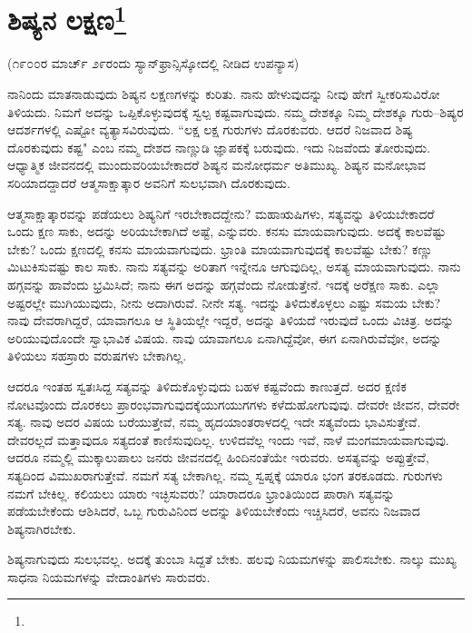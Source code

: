 
\chapter[ಶಿಷ್ಯನ ಲಕ್ಷಣ]{ಶಿಷ್ಯನ ಲಕ್ಷಣ\protect\footnote{}}

\begin{center}
(೧೯೦೦ರ ಮಾರ್ಚ್ ೨೯ರಂದು ಸ್ಯಾನ್‌ಫ್ರಾನ್ಸಿಸ್ಕೋದಲ್ಲಿ ನೀಡಿದ ಉಪನ್ಯಾಸ)
\end{center}

ನಾನಿಂದು ಮಾತನಾಡುವುದು ಶಿಷ್ಯನ ಲಕ್ಷಣಗಳನ್ನು ಕುರಿತು. ನಾನು ಹೇಳುವುದನ್ನು ನೀವು ಹೇಗೆ ಸ್ವೀಕರಿಸುವಿರೋ ತಿಳಿಯದು. ನಿಮಗೆ ಅದನ್ನು ಒಪ್ಪಿಕೊಳ್ಳುವುದಕ್ಕೆ ಸ್ವಲ್ಪ ಕಷ್ಟವಾಗುವುದು. ನಮ್ಮ ದೇಶಕ್ಕೂ ನಿಮ್ಮ ದೇಶಕ್ಕೂ ಗುರು–ಶಿಷ್ಯರ ಆದರ್ಶಗಳಲ್ಲಿ ಎಷ್ಟೋ ವ್ಯತ್ಯಾಸವಿರುವುದು. “ಲಕ್ಷ ಲಕ್ಷ ಗುರುಗಳು ದೊರಕುವರು. ಆದರೆ ನಿಜವಾದ ಶಿಷ್ಯ ದೊರಕುವುದು ಕಷ್ಟ" ಎಂಬ ನಮ್ಮ ದೇಶದ ನಾಣ್ಣುಡಿ ಜ್ಞಾಪಕಕ್ಕೆ ಬರುವುದು. ಇದು ನಿಜವೆಂದು ತೋರುವುದು. ಆಧ್ಯಾತ್ಮಿಕ ಜೀವನದಲ್ಲಿ ಮುಂದುವರಿಯಬೇಕಾದರೆ ಶಿಷ್ಯನ ಮನೋಧರ್ಮ ಅತಿಮುಖ್ಯ. ಶಿಷ್ಯನ ಮನೋಭಾವ ಸರಿಯಾದದ್ದಾದರೆ ಆತ್ಮಸಾಕ್ಷಾತ್ಕಾರ ಅವನಿಗೆ ಸುಲಭವಾಗಿ ದೊರಕುವುದು.

ಆತ್ಮಸಾಕ್ಷಾತ್ಕಾರವನ್ನು ಪಡೆಯಲು ಶಿಷ್ಯನಿಗೆ ಇರಬೇಕಾದದ್ದೇನು? ಮಹಾಋಷಿಗಳು, ಸತ್ಯವನ್ನು ತಿಳಿಯಬೇಕಾದರೆ ಒಂದು ಕ್ಷಣ ಸಾಕು, ಅದನ್ನು ಅರಿಯಬೇಕಾಗಿದೆ ಅಷ್ಟೆ, ಎನ್ನುವರು. ಕನಸು ಮಾಯವಾಗುವುದು. ಅದಕ್ಕೆ ಕಾಲವೆಷ್ಟು ಬೇಕು? ಒಂದು ಕ್ಷಣದಲ್ಲಿ ಕನಸು ಮಾಯವಾಗುವುದು. ಭ್ರಾಂತಿ ಮಾಯವಾಗುವುದಕ್ಕೆ ಕಾಲವೆಷ್ಟು ಬೇಕು? ಕಣ್ಣು ಮಿಟುಕಿಸುವಷ್ಟು ಕಾಲ ಸಾಕು. ನಾನು ಸತ್ಯವನ್ನು ಅರಿತಾಗ ಇನ್ನೇನೂ ಆಗುವುದಿಲ್ಲ, ಅಸತ್ಯ ಮಾಯವಾಗುವುದು. ನಾನು ಹಗ್ಗವನ್ನು ಹಾವೆಂದು ಭ್ರಮಿಸಿದೆ; ನಾನು ಈಗ ಅದನ್ನು ಹಗ್ಗವೆಂದು ನೋಡುತ್ತೇನೆ. ಇದಕ್ಕೆ ಅರೆಕ್ಷಣ ಸಾಕು. ಎಲ್ಲಾ ಅಷ್ಟರಲ್ಲೇ ಮುಗಿಯುವುದು, ನೀನು ಅದಾಗಿರುವೆ. ನೀನೇ ಸತ್ಯ. ಇದನ್ನು ತಿಳಿದುಕೊಳ್ಳಲು ಎಷ್ಟು ಸಮಯ ಬೇಕು? ನಾವು ದೇವರಾಗಿದ್ದರೆ, ಯಾವಾಗಲೂ ಆ ಸ್ಥಿತಿಯಲ್ಲೇ ಇದ್ದರೆ, ಅದನ್ನು ತಿಳಿಯದೆ ಇರುವುದೆ ಒಂದು ವಿಚಿತ್ರ. ಅದನ್ನು ಅರಿಯುವುದೊಂದೇ ಸ್ವಾಭಾವಿಕ ವಿಷಯ. ನಾವು ಯಾವಾಗಲೂ ಏನಾಗಿದ್ದೆವೋ, ಈಗ ಏನಾಗಿರುವೆವೋ, ಅದನ್ನು ತಿಳಿಯಲು ಸಹಸ್ರಾರು ವರುಷಗಳು ಬೇಕಾಗಿಲ್ಲ.

ಆದರೂ ಇಂತಹ ಸ್ವತಃಸಿದ್ದ ಸತ್ಯವನ್ನು ತಿಳಿದುಕೊಳ್ಳುವುದು ಬಹಳ ಕಷ್ಟವೆಂದು ಕಾಣುತ್ತದೆ. ಅದರ ಕ್ಷಣಿಕ ನೋಟವೊಂದು ದೊರಕಲು ಪ್ರಾರಂಭವಾಗುವುದಕ್ಕೆ\break ಯುಗಯುಗಗಳು ಕಳೆದುಹೋಗುವುವು. ದೇವರೇ ಜೀವನ, ದೇವರೇ ಸತ್ಯ. ನಾವು ಅದರ ವಿಷಯ ಬರೆಯುತ್ತೇವೆ, ನಮ್ಮ ಹೃದಯಾಂತರಾಳದಲ್ಲಿ ಇದೇ ಸತ್ಯವೆಂದು ಭಾವಿಸುತ್ತೇವೆ. ದೇವರಲ್ಲದೆ ಮತ್ತಾವುದೂ ಸತ್ಯದಂತೆ ಕಾಣಿಸುವುದಿಲ್ಲ. ಉಳಿದವೆಲ್ಲ ಇಂದು ಇವೆ, ನಾಳೆ ಮಂಗಮಾಯವಾಗುವುವು. ಆದರೂ ನಮ್ಮಲ್ಲಿ ಮುಕ್ಕಾಲುಪಾಲು ಜನರು ಜೀವನದಲ್ಲಿ ಹಿಂದಿನಂತೆಯೇ ಇರುವರು. ಅಸತ್ಯವನ್ನು ಅಪ್ಪುತ್ತೇವೆ, ಸತ್ಯದಿಂದ ವಿಮುಖರಾಗುತ್ತೇವೆ. ನಮಗೆ ಸತ್ಯ ಬೇಕಾಗಿಲ್ಲ. ನಮ್ಮ ಸ್ವಪ್ನಕ್ಕೆ ಯಾರೂ ಭಂಗ ತರಕೂಡದು. ಗುರುಗಳು ನಮಗೆ ಬೇಕಿಲ್ಲ. ಕಲಿಯಲು ಯಾರು ಇಚ್ಛಿಸುವರು? ಯಾರಾದರೂ ಭ್ರಾಂತಿಯಿಂದ ಪಾರಾಗಿ ಸತ್ಯವನ್ನು ಪಡೆಯಬೇಕೆಂದು ಆಶಿಸಿದರೆ, ಒಬ್ಬ ಗುರುವಿನಿಂದ ಅದನ್ನು ತಿಳಿಯಬೇಕೆಂದು ಇಚ್ಚಿಸಿದರೆ, ಅವನು ನಿಜವಾದ ಶಿಷ್ಯನಾಗಿರಬೇಕು.

ಶಿಷ್ಯನಾಗುವುದು ಸುಲಭವಲ್ಲ. ಅದಕ್ಕೆ ತುಂಬಾ ಸಿದ್ದತೆ ಬೇಕು. ಹಲವು ನಿಯಮಗಳನ್ನು ಪಾಲಿಸಬೇಕು. ನಾಲ್ಕು ಮುಖ್ಯ ಸಾಧನಾ ನಿಯಮಗಳನ್ನು ವೇದಾಂತಿಗಳು ಸಾರುವರು.

